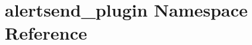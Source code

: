 \hypertarget{namespacealertsend__plugin}{\section{alertsend\-\_\-plugin Namespace Reference}
\label{namespacealertsend__plugin}
}
